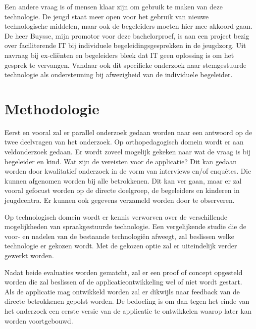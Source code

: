 Een andere vraag is of mensen klaar zijn om gebruik te maken van deze technologie. De jeugd staat meer open voor het gebruik van nieuwe technologische middelen, maar ook de begeleiders moeten hier mee akkoord gaan. De heer Buysse, mijn promotor voor deze bachelorproef, is aan een project bezig over faciliterende IT bij individuele begeleidingsgesprekken in de jeugdzorg. Uit navraag bij ex-cliënten en begeleiders bleek dat IT geen oplossing is om het gesprek te vervangen. Vandaar ook dit specifieke onderzoek naar stemgestuurde technologie als ondersteuning bij afwezigheid van de individuele begeleider.


\section{Methodologie}
\label{sec:methodologie}
Eerst en vooral zal er parallel onderzoek gedaan worden naar een antwoord op de twee deelvragen van het onderzoek.
Op orthopedagogisch domein wordt er aan veldonderzoek gedaan. Er wordt zoveel mogelijk gekeken naar wat de vraag is bij begeleider en kind. Wat zijn de vereisten voor de applicatie? Dit kan gedaan worden door kwalitatief onderzoek in de vorm van interviews en/of enquêtes. Die kunnen afgenomen worden bij alle betrokkenen. Dit kan ver gaan, maar er zal vooral gefocust worden op de directe doelgroep, de begeleiders en kinderen in jeugdcentra. Er kunnen ook gegevens verzameld worden door te observeren.

Op technologisch domein wordt er kennis verworven over de verschillende mogelijkheden van spraakgestuurde technologie. Een vergelijkende studie die de voor- en nadelen van de bestaande technologiën afweegt, zal beslissen welke technologie er gekozen wordt. Met de gekozen optie zal er uiteindelijk verder gewerkt worden.

Nadat beide evaluaties worden gematcht, zal er een proof of concept opgesteld worden die zal beslissen of de applicatieontwikkeling wel of niet wordt gestart. Als de applicatie mag ontwikkeld worden zal er dikwijls naar feedback van de directe betrokkenen gepolst worden. De bedoeling is om dan tegen het einde van het onderzoek een eerste versie van de applicatie te ontwikkelen waarop later kan worden voortgebouwd.

